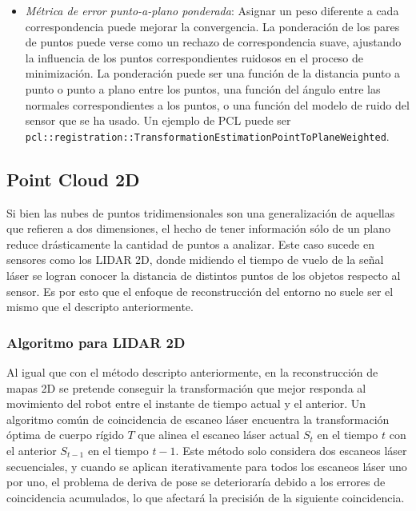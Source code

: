 \begin{itemize}
    \item \textit{Métrica de error punto-a-plano ponderada}: Asignar un peso diferente a cada correspondencia puede mejorar la convergencia. La ponderación de los pares de puntos puede verse como un rechazo de correspondencia suave, ajustando la influencia de los puntos correspondientes ruidosos en el proceso de minimización. La ponderación puede ser una función de la distancia punto a punto o punto a plano entre los puntos, una función del ángulo entre las normales correspondientes a los puntos, o una función del modelo de ruido del sensor que se ha usado. Un ejemplo de PCL puede ser \lstinline{pcl::registration::TransformationEstimationPointToPlaneWeighted}.
\end{itemize}

\subsection{Point Cloud 2D}
Si bien las nubes de puntos tridimensionales son una generalización de aquellas que refieren a dos dimensiones, el hecho de tener información sólo de un plano reduce drásticamente la cantidad de puntos a analizar. Este caso sucede en sensores como los LIDAR 2D, donde midiendo el tiempo de vuelo de la señal láser se logran conocer la distancia de distintos puntos de los objetos respecto al sensor. Es por esto que el enfoque de reconstrucción del entorno no suele ser el mismo que el descripto anteriormente.

\subsubsection{Algoritmo para LIDAR 2D}
Al igual que con el método descripto anteriormente, en la reconstrucción de mapas 2D se pretende conseguir la transformación que mejor responda al movimiento del robot entre el instante de tiempo actual y el anterior. Un algoritmo común de coincidencia de escaneo láser encuentra la transformación óptima de cuerpo rígido $T$ que alinea el escaneo láser actual $S_t$ en el tiempo $t$ con el anterior $S_{t-1}$ en el tiempo $t-1$. Este método solo considera dos escaneos láser secuenciales, y cuando se aplican iterativamente para todos los escaneos láser uno por uno, el problema de deriva de pose se deterioraría debido a los errores de coincidencia acumulados, lo que afectará la precisión de la siguiente coincidencia. 

